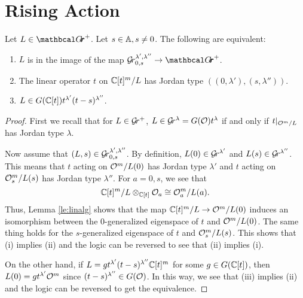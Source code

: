 \documentclass[draft]{article}
\begin{document}
\section{Rising Action}
\label{s:theproblem}
\begin{lemma} 
\label{le:Grl1l2}
    Let $ L \in \Grth^+ $.  Let $ s \in \AA, s \ne 0 $.  The following are equivalent:
    \begin{enumerate}
        \item $ L $ is in the image of the map $ \Gr^{\lambda', \lambda''}_{0,s} \rightarrow \Grth^+$. %
        \item The linear operator $ t $ on $ \CC[t]^m/L$ has Jordan type $((0,\lambda'), (s,\lambda''))$.
        \item $ L \in G(\CC[t]) t^{\lambda'} (t-s)^{\lambda''}$.
    \end{enumerate}
\end{lemma}
% 
\begin{proof}
First we recall that for $ L \in \Gr^+$, $ L \in \Gr^{\lambda} = G(\cO)t^\lambda $ if and only if $ t |_{\cO^m/L} $ has Jordan type $ \lambda$. 

Now assume that $ (L, s) \in \Gr^{\lambda', \lambda''}_{0,s}$.  By definition, $ L(0) \in \Gr^{\lambda'}$ and $L(s) \in \Gr^{\lambda''} $.  This means that $t $ acting on 
$\cO^m/L(0)$ has Jordan type $ \lambda'$ and $ t$ acting on 
$\cO_s^m/L(s)$ has Jordan type $ \lambda''$.  For $ a = 0, s$,  we see that $$\CC[t]^m/L \otimes_{\CC[t]} \cO_a \cong \cO_a^m / L(a). $$
Thus, Lemma \ref{le:linalg} shows that the map
$\CC[t]^m/L\to \cO^m/L(0)$ induces an isomorphism between the $0$-generalized eigenspace of $ t$ and $ \cO^m / L(0)$.   The same thing holds for the $s$-generalized eigenspace of $t $ and $ \cO_s^m/L(s)$. This shows that (i) implies (ii) and the logic can be reversed to see that (ii) implies (i). 

On the other hand, if $ L = g t^{\lambda'} (t-s)^{\lambda''} \CC[t]^m$ for some $ g \in G(\CC[t])$, then $ L(0) = g t^{\lambda'}\cO^m $ since 
$ (t-s)^{\lambda''} \in G(\cO)$. In this way, we see that (iii) implies (ii) and the logic can be reversed to get the equivalence.
\end{proof}
\end{document}
